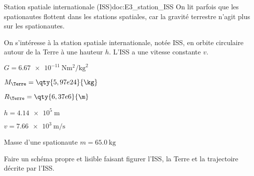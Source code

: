  

\begin{doc}{Station spatiale internationale (ISS)}{doc:E3_station_ISS}
  On lit parfois que les spationautes flottent dans les stations spatiales, car la gravité terrestre n'agit plus sur les spationautes.
  
  \begin{wrapfigure}{r}{0.4\linewidth}
    \vspace*{-30pt}
    \centering
  \end{wrapfigure}
  
  On s'intéresse à la station spatiale internationale, notée ISS, en orbite circulaire autour de la Terre à une hauteur $h$.
  L'ISS a une vitesse constante $v$.

  \begin{listePoints}
    \item $G = \qty{6,67e-11}{\newton\m\squared \per\kg\squared}$
    \item $M_\Terre = \qty{5,97e24}{\kg}$
    \item $R_\Terre = \qty{6,37e6}{\m}$
    \item $h = \qty{4,14e5}{\m}$
    \item $v = \qty{7,66e3}{\m\per\s}$
    \item Masse d'une spationaute $m = \qty{65,0}{\kg}$
  \end{listePoints}
\end{doc}


\numeroQuestion
  \label{exo:schema_ISS}
  Faire un schéma propre et lisible faisant figurer l'ISS, la Terre et la trajectoire décrite par l'ISS.


